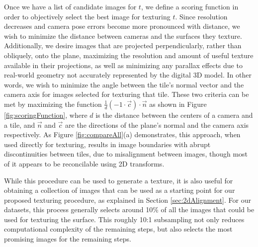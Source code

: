 \documentclass[]{spie}  %
\begin{document}
Once we have a list of candidate images for $t$, we define a scoring
function in order to objectively select the best image for texturing
$t$. Since resolution decreases and camera pose errors become more
pronounced with distance, we wish to minimize the distance between
cameras and the surfaces they texture. Additionally, we desire images
that are projected perpendicularly, rather than obliquely, onto the
plane, maximizing the resolution and amount of useful texture
available in their projections, as well as minimizing any parallax
effects due to real-world geometry not accurately represented by the
digital 3D model. In other words, we wish to minimize the angle
between the tile's normal vector and the camera axis for images
selected for texturing that tile. These two criteria can be met by
maximizing the function $\frac{1}{d} (-1 \cdot \vec{c}) \cdot \vec{n}$
as shown in Figure \ref{fig:scoringFunction}, where $d$ is the
distance between the centers of a camera and a tile, and $\vec{n}$ and
$\vec{c}$ are the directions of the plane's normal and the camera axis
respectively. As Figure \ref{fig:compareAll}(a) demonstrates, this
approach, when used directly for texturing, results in image
boundaries with abrupt discontinuities between tiles, due to
misalignment between images, though most of it appears to be
reconcilable using 2D transforms.

While this procedure can be used to generate a texture, it is also
useful for obtaining a collection of images that can be used as a
starting point for our proposed texturing procedure, as explained in
Section \ref{sec:2dAlignment}. For our datasets, this process
generally selects around 10\% of all the images that could be used for
texturing the surface. This roughly 10:1 subsampling not only reduces
computational complexity of the remaining steps, but also selects the
most promising images for the remaining steps.
\end{document}
